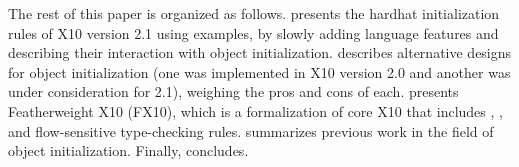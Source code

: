 The rest of this paper is organized as follows.
 presents the hardhat initialization rules of X10 version 2.1
    using examples,
    by slowly adding language features and describing their interaction with
    object initialization.
 describes alternative designs for object initialization
    (one was implemented in X10 version 2.0 and another was under consideration for 2.1),
    weighing the pros and cons of each.
 presents Featherweight X10 (FX10), which is a formalization of core X10
    that includes \finish, \async, and flow-sensitive type-checking rules.
 summarizes previous work in the field of object initialization.
Finally,  concludes.
